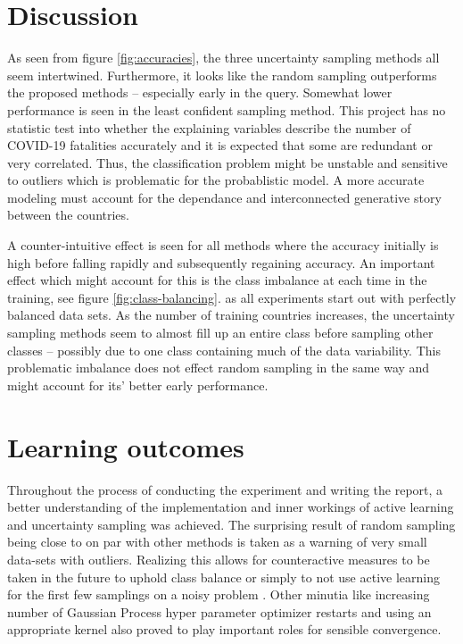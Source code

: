 \documentclass[12pt,fleqn]{article}
\begin{document}
	
\begin{multicols}{2}

	\section{Discussion} %
		
As seen from figure \ref{fig:accuracies}, the three uncertainty sampling methods all seem intertwined. Furthermore, it looks like the random sampling outperforms the proposed methods -- especially early in the query. Somewhat lower performance is seen in the least confident sampling method. This project has no statistic test into whether the explaining variables describe the number of COVID-19 fatalities accurately and it is expected that some are redundant or very correlated. Thus, the classification problem might be  unstable and sensitive to outliers which is problematic for the probablistic model. A more accurate modeling must account for the dependance and interconnected generative story between the countries.
	
A counter-intuitive effect is seen for all methods where the accuracy initially is high before falling rapidly and subsequently regaining accuracy. An important effect which might account for this is the class imbalance at each time in the training, see figure \ref{fig:class-balancing}. as all experiments start out with perfectly balanced data sets. As the number of training countries increases, the uncertainty sampling methods seem to almost fill up an entire class before sampling other classes -- possibly due to one class containing much of the data variability. This problematic imbalance does not effect random sampling in the same way and might account for its' better early performance.
		
		
\section{Learning outcomes} %
Throughout the process of conducting the experiment and writing the report, a better understanding of the implementation and inner workings of active learning and uncertainty sampling was achieved. The surprising result of random sampling being close to on par with other methods is taken as a warning of very small data-sets with outliers. Realizing this allows for counteractive measures to be taken in the future to uphold class balance or simply to not use active learning for the first few samplings on a noisy problem . Other minutia like increasing number of Gaussian Process hyper parameter optimizer restarts and using an appropriate kernel  also proved to play important roles for sensible convergence.
		
\end{multicols}
\end{document}
